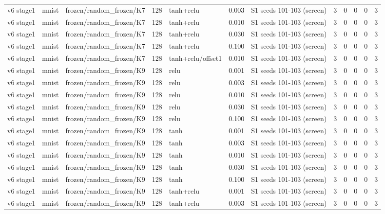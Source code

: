 \begin{table}[htbp]
{\begin{tabular}{@{}lllrlrlrrrrr@{}}
v6 stage1 & mnist & frozen/random\_frozen/K7 & 128 & tanh+relu & 0.003 & S1 seeds 101-103 (screen) & 3 & 0 & 0 & 0 & 3 \\
v6 stage1 & mnist & frozen/random\_frozen/K7 & 128 & tanh+relu & 0.010 & S1 seeds 101-103 (screen) & 3 & 0 & 0 & 0 & 3 \\
v6 stage1 & mnist & frozen/random\_frozen/K7 & 128 & tanh+relu & 0.030 & S1 seeds 101-103 (screen) & 3 & 0 & 0 & 0 & 3 \\
v6 stage1 & mnist & frozen/random\_frozen/K7 & 128 & tanh+relu & 0.100 & S1 seeds 101-103 (screen) & 3 & 0 & 0 & 0 & 3 \\
v6 stage1 & mnist & frozen/random\_frozen/K7 & 128 & tanh+relu/offset1 & 0.010 & S1 seeds 101-103 (screen) & 3 & 0 & 0 & 0 & 3 \\
v6 stage1 & mnist & frozen/random\_frozen/K9 & 128 & relu & 0.001 & S1 seeds 101-103 (screen) & 3 & 0 & 0 & 0 & 3 \\
v6 stage1 & mnist & frozen/random\_frozen/K9 & 128 & relu & 0.003 & S1 seeds 101-103 (screen) & 3 & 0 & 0 & 0 & 3 \\
v6 stage1 & mnist & frozen/random\_frozen/K9 & 128 & relu & 0.010 & S1 seeds 101-103 (screen) & 3 & 0 & 0 & 0 & 3 \\
v6 stage1 & mnist & frozen/random\_frozen/K9 & 128 & relu & 0.030 & S1 seeds 101-103 (screen) & 3 & 0 & 0 & 0 & 3 \\
v6 stage1 & mnist & frozen/random\_frozen/K9 & 128 & relu & 0.100 & S1 seeds 101-103 (screen) & 3 & 0 & 0 & 0 & 3 \\
v6 stage1 & mnist & frozen/random\_frozen/K9 & 128 & tanh & 0.001 & S1 seeds 101-103 (screen) & 3 & 0 & 0 & 0 & 3 \\
v6 stage1 & mnist & frozen/random\_frozen/K9 & 128 & tanh & 0.003 & S1 seeds 101-103 (screen) & 3 & 0 & 0 & 0 & 3 \\
v6 stage1 & mnist & frozen/random\_frozen/K9 & 128 & tanh & 0.010 & S1 seeds 101-103 (screen) & 3 & 0 & 0 & 0 & 3 \\
v6 stage1 & mnist & frozen/random\_frozen/K9 & 128 & tanh & 0.030 & S1 seeds 101-103 (screen) & 3 & 0 & 0 & 0 & 3 \\
v6 stage1 & mnist & frozen/random\_frozen/K9 & 128 & tanh & 0.100 & S1 seeds 101-103 (screen) & 3 & 0 & 0 & 0 & 3 \\
v6 stage1 & mnist & frozen/random\_frozen/K9 & 128 & tanh+relu & 0.001 & S1 seeds 101-103 (screen) & 3 & 0 & 0 & 0 & 3 \\
v6 stage1 & mnist & frozen/random\_frozen/K9 & 128 & tanh+relu & 0.003 & S1 seeds 101-103 (screen) & 3 & 0 & 0 & 0 & 3 \\

\end{tabular}}
\end{table}
